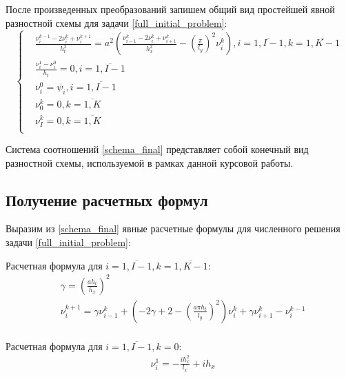 {{			После произведенных преобразований запишем общий вид простейшей явной разностной схемы для задачи \eqref{full_initial_problem}:
			\begin{equation} \label{schema_final}
					\left\{
					\begin{split}
						&\frac{\nu^{k-1}_i - 2\nu^{k}_i + \nu^{k+1}_i}{h_t^2} = a^2\left(\frac{\nu^{k}_{i-1} - 2\nu^{k}_i + \nu^{k}_{i+1}}{h_x^2} - \left(\frac{\pi}{l_y}\right)^2 \nu^{k}_i\right) ,  i =  \overline{ 1, I-1}, k =  \overline{ 1, K-1}\\
						& \frac{\nu^{1}_i - \nu^{0}_i}{h_t} = 0,  i = \overline{ 1, I-1} \\
						&\nu^0_{i} = \psi_i, i =  \overline{ 1, I-1}\\
						&\nu^k_{0} = 0, k =  \overline{1, K}\\
						&\nu^k_{I} = 0, k =  \overline{1, K}\\
					\end{split}
					\right.
				\end{equation}
			
			Система соотношений \eqref{schema_final} представляет собой конечный вид разностной схемы, используемой в рамках данной курсовой работы. 
	
	}
	\subsection{Получение расчетных формул}{
		Выразим из \eqref{schema_final} явные расчетные формулы для численного решения задачи \eqref{full_initial_problem}:
		
		Расчетная формула для $i =  \overline{ 1, I-1}, k =  \overline{ 1, K-1}$:
		\begin{equation} \label{solution_main}
			\begin{split}
			& \gamma = \left(\frac{a h_t}{h_x}\right)^2 \\
			& \nu^{k+1}_i = \gamma\nu^k_{i-1}+\left(-2\gamma+2-\left(\frac{a\pi h_t}{l_y}\right)^2\right)\nu^k_i + \gamma\nu^k_{i+1}-\nu^{k-1}_i \\
			\end{split}
		\end{equation}
		
		Расчетная формула для $i =  \overline{ 1, I-1}, k =  0$:
		\begin{equation} \label{solution_k0}
		\begin{split}
		& \nu^{1}_i = -\frac{ih_x^2}{l_x} + ih_x \\
		\end{split}
		\end{equation}
		
}}
